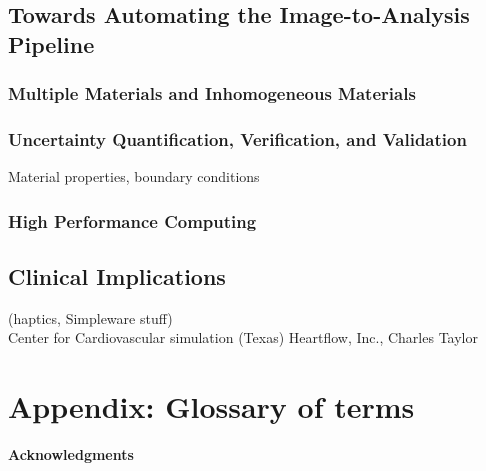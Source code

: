 \documentclass[12pt]{article}
\begin{document}
\subsection{Towards Automating the Image-to-Analysis Pipeline}
\label{Towards Automating the Image-to-Analysis Pipeline}
\subsubsection{Multiple Materials and Inhomogeneous Materials}
\label{Multiple Materials and Inhomogeneous Materials}
\subsubsection{Uncertainty Quantification, Verification, and Validation}
\label{Uncertainty Quantification, Verification, and Validation}
Material properties, boundary conditions
\subsubsection{High Performance Computing}
\label{High Performance Computing}
\subsection{Clinical Implications}
\label{Clinical Implications}
(haptics, Simpleware stuff)\\
Center for Cardiovascular simulation (Texas)
Heartflow, Inc., Charles Taylor
\newpage
\renewcommand{\theequation}{A.\arabic{equation}}
\setcounter{equation}{0}
\section{Appendix: Glossary of terms}
\label{Appendix}

\newpage
\thispagestyle{empty}
\noindent
{\bf\Large Acknowledgments}
\vspace{4mm}


\newpage
 
\newpage
\pagestyle{empty} 



\end{document}
